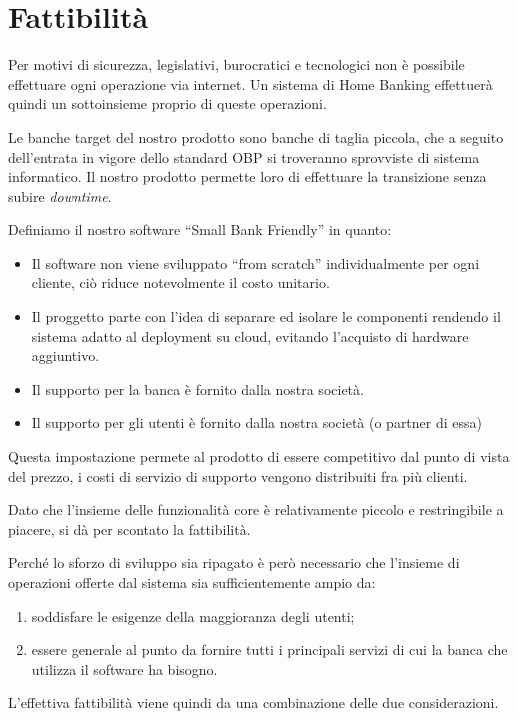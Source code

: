 \documentclass[10pt]{softeng} %
\begin{document}
\section{Fattibilit\`a}


Per motivi di sicurezza, legislativi, burocratici e tecnologici non \`e possibile effettuare ogni operazione via internet.
Un sistema di Home Banking effettuer\`a quindi un sottoinsieme proprio di queste operazioni.


Le banche target del nostro prodotto sono banche di taglia piccola, che a seguito dell'entrata in vigore dello standard OBP si troveranno sprovviste di sistema informatico. Il nostro prodotto permette loro di effettuare la transizione senza subire \emph{downtime}.

Definiamo il nostro software ``Small Bank Friendly'' in quanto:
\begin{itemize}
    \item Il software non viene sviluppato ``from scratch'' individualmente per ogni cliente, ci\`o riduce notevolmente il costo unitario.
    \item Il proggetto parte con l'idea di separare ed isolare le componenti rendendo il sistema adatto al deployment su cloud, evitando l'acquisto di hardware aggiuntivo.
    \item Il supporto per la banca \`e fornito dalla nostra societ\`a.
    \item Il supporto per gli utenti \`e fornito dalla nostra societ\`a (o partner di essa)
\end {itemize}

Questa impostazione permete al prodotto di essere competitivo dal punto di vista del prezzo, i costi di servizio di supporto vengono distribuiti fra pi\`u clienti. 



Dato che l'insieme delle funzionalit\`a core \`e relativamente piccolo e restringibile a piacere, si d\`a per scontato la fattibilit\`a.

Perch\'e lo sforzo di sviluppo sia ripagato \`e per\`o necessario che l'insieme di operazioni offerte dal sistema sia sufficientemente ampio da:
\begin{enumerate}
	\item soddisfare le esigenze della maggioranza degli utenti;
	\item essere generale al punto da fornire tutti i principali servizi di cui la banca che utilizza il software ha bisogno.
\end{enumerate}
L'effettiva fattibilit\`a viene quindi da una combinazione delle due considerazioni.
\end{document}
